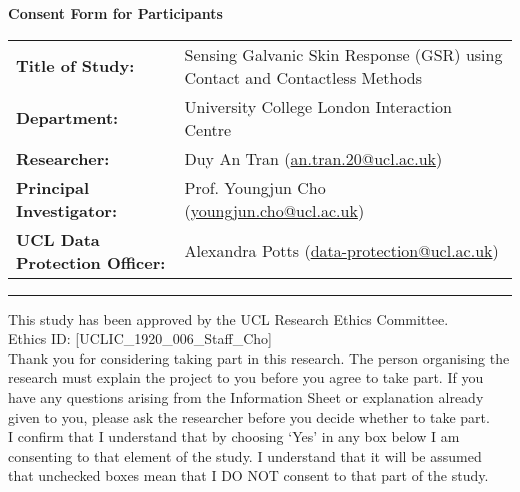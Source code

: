 \documentclass[12pt]{article}
\begin{document}
\begin{center}
    {\Large\bfseries\large\bfseries Consent Form for Participants}\\[2ex]
\end{center}

\noindent
\begin{tabularx}{\textwidth}{@{}lX@{}}
    \textbf{Title of Study:} & Sensing Galvanic Skin Response (GSR) using Contact and Contactless Methods \\
    \textbf{Department:} & University College London Interaction Centre \\
    \textbf{Researcher:} & Duy An Tran (\href{mailto:an.tran.20@ucl.ac.uk}{an.tran.20@ucl.ac.uk}) \\
    \textbf{Principal Investigator:} & Prof. Youngjun Cho (\href{mailto:youngjun.cho@ucl.ac.uk}{youngjun.cho@ucl.ac.uk}) \\
    \textbf{UCL Data Protection Officer:} & Alexandra Potts (\href{mailto:data-protection@ucl.ac.uk}{data-protection@ucl.ac.uk})
\end{tabularx}

\bigskip
\hrule
\bigskip

\noindent
This study has been approved by the UCL Research Ethics Committee.
\\ Ethics ID: [UCLIC\_1920\_006\_Staff\_Cho] \\[1ex]
Thank you for considering taking part in this research. The person organising the research must explain the project to you before you agree to take part. If you have any questions arising from the Information Sheet or explanation already given to you, please ask the researcher before you decide whether to take part.
\\[2ex]
\noindent I confirm that I understand that by choosing ‘Yes’ in any box below I am consenting to that element of the study. I understand that it will be assumed that unchecked boxes mean that I DO NOT consent to that part of the study.

\bigskip
\end{document}
